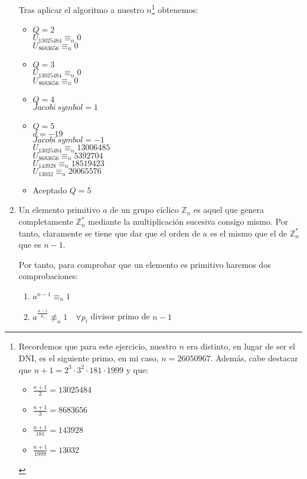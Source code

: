 \begin{enumerate}
		Tras aplicar el algoritmo a nuestro $n$\footnote{Recordemos que para este ejercicio, nuestro $n$ era
		distinto, en lugar de ser el DNI, es el siguiente primo, en mi caso, $n = 26050967$. Además, cabe destacar
		que $n+1 = 2^3 \cdot 3^2 \cdot 181 \cdot 1999$ y que:
		\begin{itemize}
			\item $\displaystyle \frac{n+1}{2} = 13025484$
			\item $\displaystyle \frac{n+1}{3} = 8683656$
			\item $\displaystyle \frac{n+1}{181} = 143928$
			\item $\displaystyle \frac{n+1}{1999} = 13032$
		\end{itemize}} obtenemos:
		\begin{itemize}
			\item $Q = 2$ \\
			$U_{13025484} \equiv_n 0$ \\
			$U_{8683656} \equiv_n 0$
			
			\item $Q = 3$ \\
			$U_{13025484} \equiv_n 0$ \\
			$U_{8683656} \equiv_n 0$
			
			\item $Q = 4$ \\
			$Jacobi\ symbol = 1$
			
			\item $Q = 5$ \\
			$d = -19$ \\
			$Jacobi\ symbol = -1$ \\
			$U_{13025484} \equiv_n 13006485$ \\
			$U_{8683656} \equiv_n 5392704$ \\
			$U_{143928} \equiv_n 18519423$ \\
			$U_{13032} \equiv_n 20065576$
			
			\item Aceptado $Q = 5$
		\end{itemize}

		\item Un elemento primitivo $a$ de un grupo cíclico $\mathbb{Z}_n$ es aquel que genera completamente
		$\mathbb{Z}_n^*$ mediante la multiplicación sucesiva consigo mismo. Por tanto, claramente se tiene que
		dar que el orden de $a$ es el mismo que el de $\mathbb{Z}_n^*$ que es $n-1$.
		
		Por tanto, para comprobar que un elemento es primitivo haremos dos comprobaciones:
		\begin{enumerate}
			\item $a^{n-1} \equiv_n 1$
			\item $a^\frac{n-1}{p_i} \not\equiv_n 1 \quad \forall p_i$ divisor primo de $n-1$
		\end{enumerate}
		

\end{enumerate}
